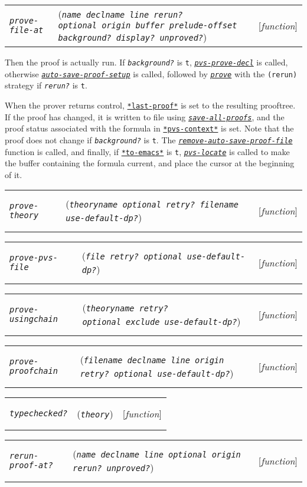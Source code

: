 \documentclass[12pt]{book}
\makeatletter
\def\ampoptional{{\smaller\sc {\smaller\smaller \&}optional\ }}
\newenvironment{function}[3]%
{\par\noindent\begin{boxedminipage}{\textwidth}%
 \par\noindent\begin{tabularx}{\linewidth}{l>{\raggedright}Xr}%
 \functionhtgt{#1}&(\texttt{\textit{#2}})&[\emph{#3}]%
 \end{tabularx}\par\flushright\begin{minipage}{.97\textwidth}}
{\end{minipage}\end{boxedminipage}}
\newcommand{\functionarg}[1]{\texttt{\textit{#1}}}
\newcommand{\functionnm}[1]{\texttt{\textit{#1}}}
\newcommand{\functionhln}[1]{\hyperlink{#1}{\functionnm{#1}}}
\newcommand{\functionhtgt}[1]{\hypertarget{#1}{\functionnm{#1}}\index{#1@\functionnm{#1}|underline}}
\newenvironment{lispfunction}[2]%
{\begin{function}{#1}{#2}{function}}{\end{function}}
\newcommand{\globalnm}[1]{\texttt{\textup{#1}}}
\newcommand{\globalhln}[1]{\hyperlink{#1}{\globalnm{#1}}}
\makeatother
\begin{document}
\begin{lispfunction}{prove-file-at}{name declname line rerun? \ampoptional origin buffer prelude-offset background? display? unproved?}
Then the proof is actually run.  If \functionarg{background?} is
\texttt{t}, \functionhln{pvs-prove-decl} is called, otherwise
\functionhln{auto-save-proof-setup} is called, followed by
\functionhln{prove} with the \texttt{(rerun)} strategy if
\functionarg{rerun?} is \texttt{t}.

When the prover returns control, \globalhln{*last-proof*} is set to the
resulting prooftree.  If the proof has changed, it is written to file
using \functionhln{save-all-proofs}, and the proof status associated with
the formula in \globalhln{*pvs-context*} is set.  Note that the proof does
not change if \functionarg{background?} is \texttt{t}.  The
\functionhln{remove-auto-save-proof-file} function is called, and finally,
if \globalhln{*to-emacs*} is \texttt{t}, \functionhln{pvs-locate} is
called to make the buffer containing the formula current, and place the
cursor at the beginning of it.
\end{lispfunction}

\begin{lispfunction}{prove-theory}
  {theoryname \ampoptional retry? filename use-default-dp?}
\end{lispfunction}

\begin{lispfunction}{prove-pvs-file}
  {file retry? \ampoptional use-default-dp?}
\end{lispfunction}

\begin{lispfunction}{prove-usingchain}
  {theoryname retry? \ampoptional exclude use-default-dp?}
\end{lispfunction}

\begin{lispfunction}{prove-proofchain}
  {filename declname line origin retry? \ampoptional use-default-dp?}
\end{lispfunction}

\begin{lispfunction}{typechecked?}{theory}
\end{lispfunction}

\begin{lispfunction}{rerun-proof-at?}
  {name declname line \ampoptional origin rerun? unproved?}
\end{lispfunction}
\end{document}
